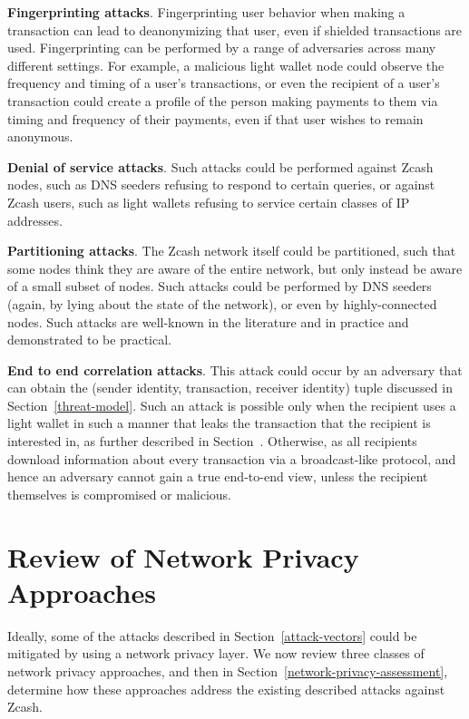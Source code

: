 \documentclass{article}
\begin{document}
\textbf{Fingerprinting attacks}. Fingerprinting user behavior when making a
transaction can lead to deanonymizing that user, even if shielded transactions
are used. Fingerprinting can be performed by a range of adversaries across many
different settings. For example, a malicious light wallet node could observe
the frequency and timing of a user’s transactions, or even the recipient of a
user’s transaction could create a profile of the person making payments to them
via timing and frequency of their payments, even if that user wishes to remain
anonymous.

\textbf{Denial of service attacks}. Such attacks could be performed against
Zcash nodes, such as DNS seeders refusing to respond to certain queries, or
against Zcash users, such as light wallets refusing to service certain classes
of IP addresses.

\textbf{Partitioning attacks}. The Zcash network itself could be partitioned,
such that some nodes think they are aware of the entire network, but only
instead be aware of a small subset of nodes. Such attacks could be performed by
DNS seeders (again, by lying about the state of the network), or even by
highly-connected nodes. Such attacks are well-known in the literature and in
practice and demonstrated to be practical.

\textbf{End to end correlation attacks}. This attack could occur by an
adversary that can obtain the (sender identity, transaction, receiver identity)
tuple discussed in Section~\ref{threat-model}. Such an attack is possible
only when the recipient uses a light wallet in such a manner that leaks the
transaction that the recipient is interested in, as further described in
Section~\cite{light-wallet-spec}. Otherwise, as all recipients download information about every
transaction via a broadcast-like protocol, and hence an adversary cannot gain a
true end-to-end view, unless the
recipient themselves is compromised or malicious.


\section{Review of Network Privacy Approaches}
\label{network-privacy-review}

Ideally, some of the attacks described in Section~\ref{attack-vectors} could be
mitigated by using a network privacy layer. We now review three
classes of network privacy approaches, and then in
Section~\ref{network-privacy-assessment}, determine how these approaches
address the existing described attacks against Zcash.
\end{document}
